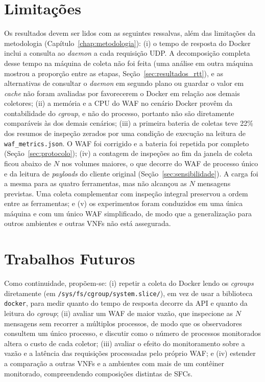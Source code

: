 \section{Limitações}

Os resultados devem ser lidos com as seguintes ressalvas, além das limitações da metodologia (Capítulo~\ref{chap:metodologia}): (i) o tempo de resposta do Docker inclui a consulta ao \textit{daemon} a cada requisição UDP. A decomposição completa desse tempo na máquina de coleta não foi feita (uma análise em outra máquina mostrou a proporção entre as etapas, Seção~\ref{sec:resultados_rtt}), e as alternativas de consultar o \textit{daemon} em segundo plano ou guardar o valor em \textit{cache} não foram avaliadas por favorecerem o Docker em relação aos demais coletores; (ii) a memória e a CPU do WAF no cenário Docker provêm da contabilidade do \textit{cgroup}, e não do processo, portanto não são diretamente comparáveis às dos demais cenários; (iii) a primeira bateria de coletas teve 22\% dos resumos de inspeção zerados por uma condição de execução na leitura de \texttt{waf\_metrics.json}. O WAF foi corrigido e a bateria foi repetida por completo (Seção~\ref{sec:protocolo}); (iv) a contagem de inspeções ao fim da janela de coleta ficou abaixo de $N$ nos volumes maiores, o que decorre do WAF de processo único e da leitura de \textit{payloads} do cliente original (Seção~\ref{sec:sensibilidade}). A carga foi a mesma para as quatro ferramentas, mas não alcançou as $N$ mensagens previstas. Uma coleta complementar com inspeção integral preservou a ordem entre as ferramentas; e (v) os experimentos foram conduzidos em uma única máquina e com um único WAF simplificado, de modo que a generalização para outros ambientes e outras VNFs não está assegurada.

\section{Trabalhos Futuros}
\label{sec:trabalhos_futuros}

Como continuidade, propõem-se: (i) repetir a coleta do Docker lendo os \textit{cgroups} diretamente (em \texttt{/sys/fs/cgroup/system.slice/}), em vez de usar a biblioteca \texttt{docker}, para medir quanto do tempo de resposta decorre da API e quanto da leitura do \textit{cgroup}; (ii) avaliar um WAF de maior vazão, que inspecione as $N$ mensagens sem recorrer a múltiplos processos, de modo que os observadores consultem um único processo, e discutir como o número de processos monitorados altera o custo de cada coletor; (iii) avaliar o efeito do monitoramento sobre a vazão e a latência das requisições processadas pelo próprio WAF; e (iv) estender a comparação a outras VNFs e a ambientes com mais de um contêiner monitorado, compreendendo composições distintas de SFCs.
